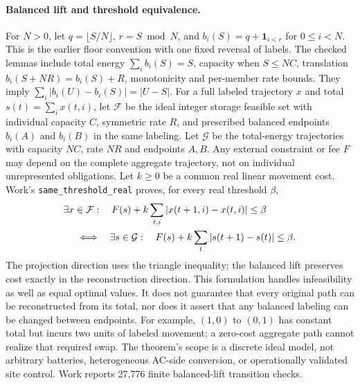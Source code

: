 \documentclass[11pt,letterpaper]{article}
\begin{document}
\paragraph{Balanced lift and threshold equivalence.} For $N>0$, let $q=\lfloor S/N\rfloor$, $r=S\bmod N$, and $b_i(S)=q+\mathbf{1}_{i<r}$ for $0\le i<N$. This is the earlier floor convention with one fixed reversal of labels. The checked lemmas include total energy $\sum_i b_i(S)=S$, capacity when $S\le NC$, translation $b_i(S+NR)=b_i(S)+R$, monotonicity and per-member rate bounds. They imply $\sum_i|b_i(U)-b_i(S)|=|U-S|$. For a full labeled trajectory $x$ and total $s(t)=\sum_i x(t,i)$, let $\mathcal F$ be the ideal integer storage feasible set with individual capacity $C$, symmetric rate $R$, and prescribed balanced endpoints $b_i(A)$ and $b_i(B)$ in the same labeling. Let $\mathcal G$ be the total-energy trajectories with capacity $NC$, rate $NR$ and endpoints $A,B$. Any external constraint or fee $F$ may depend on the complete aggregate trajectory, not on individual unrepresented obligations. Let $k\ge0$ be a common real linear movement cost. Work's \texttt{same\_threshold\_real} proves, for every real threshold $\beta$,
\begin{align}
 &\exists x\in\mathcal F:\quad F(s)+k\sum_{t,i}|x(t+1,i)-x(t,i)|\le\beta\nonumber\\
 &\hspace{5mm}\Longleftrightarrow\quad
 \exists s\in\mathcal G:\quad F(s)+k\sum_t|s(t+1)-s(t)|\le\beta .\label{eq:w03threshold}
\end{align}
The projection direction uses the triangle inequality; the balanced lift preserves cost exactly in the reconstruction direction. This formulation handles infeasibility as well as equal optimal values. It does not guarantee that every original path can be reconstructed from its total, nor does it assert that any balanced labeling can be changed between endpoints. For example, $(1,0)$ to $(0,1)$ has constant total but incurs two units of labeled movement; a zero-cost aggregate path cannot realize that required swap. The theorem's scope is a discrete ideal model, not arbitrary batteries, heterogeneous AC-side conversion, or operationally validated site control. Work reports 27,776 finite balanced-lift transition checks.
\end{document}
